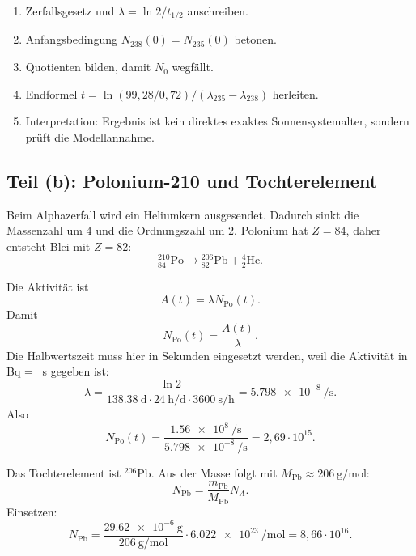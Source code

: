 \documentclass[11pt,a4paper]{scrartcl}
\newcommand{\nuclide}[3]{\ensuremath{^{#1}_{#2}\mathrm{#3}}}
\newcommand{\isotope}[2]{\ensuremath{^{#1}\mathrm{#2}}}
\theoremstyle{definition}
\theoremstyle{plain}
\theoremstyle{remark}
\begin{document}
\begin{talkbox}[title=Tafelvortrag zu Teil (a)]
\begin{enumerate}
    \item Zerfallsgesetz und $\lambda=\ln 2/t_{1/2}$ anschreiben.
    \item Anfangsbedingung $N_{238}(0)=N_{235}(0)$ betonen.
    \item Quotienten bilden, damit $N_0$ wegfällt.
    \item Endformel $t=\ln(99{,}28/0{,}72)/(\lambda_{235}-\lambda_{238})$ herleiten.
    \item Interpretation: Ergebnis ist kein direktes exaktes Sonnensystemalter, sondern prüft die Modellannahme.
\end{enumerate}
\end{talkbox}

\subsection{Teil (b): Polonium-210 und Tochterelement}

\begin{calculationbox}[title=Zerfallsgleichung]
Beim Alphazerfall wird ein Heliumkern ausgesendet. Dadurch sinkt die Massenzahl um $4$ und die Ordnungszahl um $2$. Polonium hat $Z=84$, daher entsteht Blei mit $Z=82$:
\[
    \boxed{\nuclide{210}{84}{Po}\longrightarrow \nuclide{206}{82}{Pb}+\nuclide{4}{2}{He}}.
\]
\end{calculationbox}

\begin{calculationbox}[title=Anzahl der noch vorhandenen Poloniumkerne]
Die Aktivität ist
\[
    A(t)=\lambda N_{\mathrm{Po}}(t).
\]
Damit
\[
    N_{\mathrm{Po}}(t)=\frac{A(t)}{\lambda}.
\]
Die Halbwertszeit muss hier in Sekunden eingesetzt werden, weil die Aktivität in \si{\becquerel} = \si{\per\second} gegeben ist:
\[
    \lambda
    =\frac{\ln 2}{\SI{138.38}{\day}\cdot \SI{24}{\hour\per\day}\cdot \SI{3600}{\second\per\hour}}
    =\SI{5.798e-8}{\per\second}.
\]
Also
\[
    N_{\mathrm{Po}}(t)
    =\frac{\SI{1.56e8}{\per\second}}{\SI{5.798e-8}{\per\second}}
    =2,69\cdot 10^{15}.
\]
\end{calculationbox}

\begin{calculationbox}[title=Anzahl der Blei-Tochterkerne]
Das Tochterelement ist \isotope{206}{Pb}. Aus der Masse folgt mit $M_{\mathrm{Pb}}\approx \SI{206}{\gram\per\mole}$:
\[
    N_{\mathrm{Pb}}=\frac{m_{\mathrm{Pb}}}{M_{\mathrm{Pb}}}N_A.
\]
Einsetzen:
\[
    N_{\mathrm{Pb}}
    =\frac{\SI{29.62e-6}{\gram}}{\SI{206}{\gram\per\mole}}\cdot \SI{6.022e23}{\per\mole}
    =8,66\cdot 10^{16}.
\]
\end{calculationbox}
\end{document}
